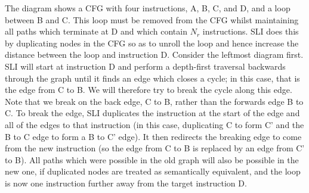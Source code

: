 
The diagram shows a CFG with four instructions, A, B, C, and D, and a loop between B and C.
This loop must be removed from the CFG whilst maintaining all paths which terminate at D and which contain $N_r$ instructions.
SLI does this by duplicating nodes in the CFG so as to unroll the loop and hence increase the distance between the loop and instruction D.
Consider the leftmost diagram first.
SLI will start at instruction D and perform a depth-first traversal backwards through the graph until it finds an edge which closes a cycle; in this case, that is the edge from C to B.
We will therefore try to break the cycle along this edge.
Note that we break on the back edge, C to B, rather than the forwards edge B to C.
To break the edge, SLI duplicates the instruction at the start of the edge and all of the edges to that instruction (in this case, duplicating C to form C' and the B to C edge to form a B to C' edge).
It then redirects the breaking edge to come from the new instruction (so the edge from C to B is replaced by an edge from C' to B).
All paths which were possible in the old graph will also be possible in the new one, if duplicated nodes are treated as semantically equivalent, and the loop is now one instruction further away from the target instruction D.

